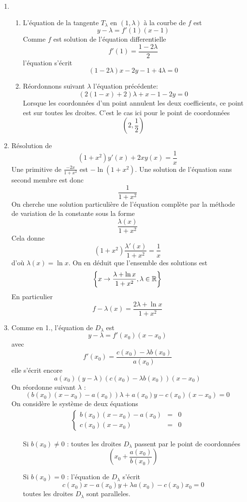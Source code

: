 \begin{enumerate}
\item \begin{enumerate}
\item L'équation de la tangente $T_\lambda$ en $(1,\lambda)$ à la courbe de $f$ est
\[ y-\lambda =f'(1)(x-1)\]
Comme $f$ est solution de l'équation differentielle 
\[f'(1)=\frac{1-2\lambda}{2}\]
l'équation s'écrit
\[(1-2\lambda)x-2y-1+4\lambda=0\]
\item Réordonnons suivant $\lambda$ l'équation précédente:
\[(2(1-x)+2)\lambda+x-1-2y=0\]
Lorsque les coordonnées d'un point annulent les deux coefficients, ce point est sur toutes les droites. C'est le cas ici pour le point de coordonnées
\[(2,\frac{1}{2})\] 
\end{enumerate}
\item Résolution de
\[(1+x^2)y'(x)+2xy(x)=\frac{1}{x}\]
Une primitive de $\frac{-2x}{1+x^2}$ est $-\ln(1+x^2)$. Une solution de l'équation sans second membre est donc
\[\frac{1}{1+x^2}\]
On cherche une solution particulière de l'équation complète par la méthode de variation de la constante sous la forme
\[\frac{\lambda(x)}{1+x^2}\]
Cela donne
\[(1+x^2)\frac{\lambda'(x)}{1+x^2}=\frac{1}{x}\]
d'où $\lambda(x)=\ln x$. On en déduit que l'ensemble des solutions est
\[\left\lbrace x\rightarrow \frac{\lambda + \ln x}{1+x^2}, \lambda \in \mathbb{R} \right\rbrace \]
En particulier
\[f-\lambda (x)=\frac{2\lambda + \ln x}{1+x^2}\]
\item Comme en 1., l'équation de $D_\lambda$ est
\[y-\lambda=f'(x_0)(x-x_0)\]
avec
\[f'(x_0)=\frac{c(x_0)-\lambda b(x_0)}{a(x_0)}\]
elle s'écrit encore
\[a(x_0)(y-\lambda)(c(x_0)-\lambda b(x_0))(x-x_0)\]
On réordonne suivant $\lambda$ :
\[(b(x_0)(x-x_0)-a(x_0))\lambda+a(x_0)y-c(x_0)(x-x_0)=0\]
On considère le système de deux équations
\begin{eqnarray*}
\left\lbrace \begin{array}{ccc}
b(x_0)(x-x_0)-a(x_0) & = & 0 \\ 
c(x_0)(x-x_0) & = & 0
\end{array} \right.
\end{eqnarray*} 
\begin{itemize}
\item[Si $b(x_0)\neq 0$ : ] toutes les droites $D_\lambda$ passent par le point de coordonnées
\[(x_0+\frac{a(x_0)}{b(x_0)})\]
\item[Si $b(x_0)= 0$ : ] l'équation de $D_\lambda$ s'écrit
\[c(x_0)x-a(x_0)y+\lambda a(x_0)-c(x_0)x_0=0\]
toutes les droites $D_\lambda$ sont paralleles.

\end{itemize}
\end{enumerate}
